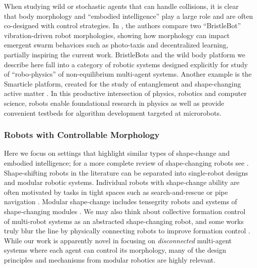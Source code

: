 \documentclass[runningheads]{llncs}
\begin{document}
When studying wild or stochastic agents that can handle collisions, it is clear that body morphology and ``embodied intelligence'' play a large role and are often co-designed with control strategies. In \cite{ben2023morphological}, the authors compare two ``BristleBot'' vibration-driven robot morphologies, showing how morphology can impact emergent swarm behaviors such as photo-taxis and decentralized learning, partially inspiring the current work. BristleBots and the wild body platform we describe here fall into a category of robotic systems designed explicitly for study of ``robo-physics'' of non-equilibrium multi-agent systems. Another example is the Smarticle platform, created for the study of entanglement and shape-changing active matter \cite{savoie2019robot,ma2022smarticle}. In this productive intersection of physics, robotics and computer science, robots enable foundational research in physics as well as provide convenient testbeds for algorithm development targeted at microrobots.


\subsubsection{Robots with Controllable Morphology} Here we focus on settings that highlight similar types of shape-change and embodied intelligence; for a more complete review of shape-changing robots see \cite{shah2021shape}. Shape-shifting robots in the literature can be separated into single-robot designs and modular robotic systems. Individual robots with shape-change ability are often motivated by tasks in tight spaces such as search-and-rescue or pipe navigation \cite{ye2006design,yanagida2017design,fabris2022crash}. Modular shape-change includes tensegrity robots \cite{rhodes2019compact} and systems of shape-changing modules \cite{zhao2022soft,nilles2022strain,bansal2023self}. We may also think about collective formation control of multi-robot systems as an abstracted shape-changing robot, and some works truly blur the line by physically connecting robots to improve formation control \cite{sugawara2016collective,karimi2020boundary,pratissoli2023coherent}. While our work is apparently novel in focusing on \emph{disconnected} multi-agent systems where each agent can control its morphology, many of the design principles and mechanisms from modular robotics are highly relevant.
\end{document}
